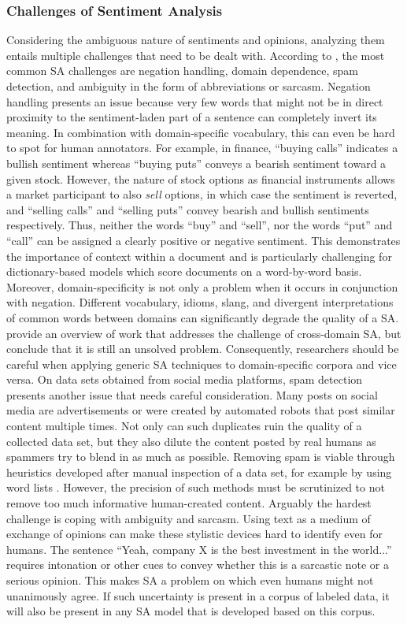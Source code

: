 \subsubsection{Challenges of Sentiment Analysis}
\label{section-sa-challenges}
Considering the ambiguous nature of sentiments and opinions, analyzing them entails multiple challenges that need to be dealt with. According to , the most common SA challenges are negation handling, domain dependence, spam detection, and ambiguity in the form of abbreviations or sarcasm. Negation handling presents an issue because very few words that might not be in direct proximity to the sentiment-laden part of a sentence can completely invert its meaning. In combination with domain-specific vocabulary, this can even be hard to spot for human annotators. For example, in finance, ``buying calls'' indicates a bullish sentiment whereas ``buying puts'' conveys a bearish sentiment toward a given stock. However, the nature of stock options as financial instruments allows a market participant to also \emph{sell} options, in which case the sentiment is reverted, and ``selling calls'' and ``selling puts'' convey bearish and bullish sentiments respectively. Thus, neither the words ``buy'' and ``sell'', nor the words ``put'' and ``call'' can be assigned a clearly positive or negative sentiment. This demonstrates the importance of context within a document and is particularly challenging for dictionary-based models which score documents on a word-by-word basis. Moreover, domain-specificity is not only a problem when it occurs in conjunction with negation. Different vocabulary, idioms, slang, and divergent interpretations of common words between domains can significantly degrade the quality of a SA.  provide an overview of work that addresses the challenge of cross-domain SA, but conclude that it is still an unsolved problem. Consequently, researchers should be careful when applying generic SA techniques to domain-specific corpora and vice versa. On data sets obtained from social media platforms, spam detection presents another issue that needs careful consideration. Many posts on social media are advertisements or were created by automated robots that post similar content multiple times. Not only can such duplicates ruin the quality of a collected data set, but they also dilute the content posted by real humans as spammers try to blend in as much as possible. Removing spam is viable through heuristics developed after manual inspection of a data set, for example by using word lists . However, the precision of such methods must be scrutinized to not remove too much informative human-created content. Arguably the hardest challenge is coping with ambiguity and sarcasm. Using text as a medium of exchange of opinions can make these stylistic devices hard to identify even for humans. The sentence ``Yeah, company X is the best investment in the world...'' requires intonation or other cues to convey whether this is a sarcastic note or a serious opinion. This makes SA a problem on which even humans might not unanimously agree. If such uncertainty is present in a corpus of labeled data, it will also be present in any SA model that is developed based on this corpus.


